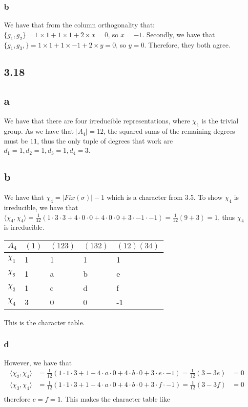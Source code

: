 \documentclass[]{article}
\begin{document}
\subsubsection*{b}
We have that from the column orthogonality that:
$\lbrace g_1, g_2 \rbrace = 1 \times 1 + 1 \times 1 + 2 \times x = 0$, so $x = -1$. Secondly, we have that $\lbrace g_1, g_3, \rbrace = 1 \times 1 + 1 \times -1 + 2 \times y = 0$, so $y = 0$. Therefore, they both agree. 
\newpage
\subsection*{3.18}
\subsection*{a}
We have that there are four irreducible representations, where $\chi_1$ is the trivial group. As we have that $|A_4| = 12$, the squared sums of the remaining degrees must be $11$, thus the only tuple of degrees that work are $d_1 = 1, d_2 = 1, d_3 = 1, d_4 = 3$. 
\subsection*{b}
We have that $\chi_4 = |Fix(\sigma)| - 1$ which is a character from 3.5. To show $\chi_4$ is irreducible, we have that $\langle \chi_4, \chi_4 \rangle = \frac{1}{12} \left(1 \cdot 3 \cdot 3 + 4 \cdot 0 \cdot 0 + 4 \cdot 0 \cdot 0 + 3 \cdot -1 \cdot -1\right) = \frac{1}{12} \left(9 + 3\right) = 1$, thus $\chi_4$ is irreducible. 

\begin{table}[h!]
\centering
\begin{tabular}{|l|l|l|l|l|}
	\hline
	$A_4$    & $(1)$ & $(123)$ & $(132)$ & $(12)(34)$ \\ \hline
	$\chi_1$ & 1     & 1       & 1       & 1          \\ \hline
	$\chi_2$ & 1     & a       & b       & e          \\ \hline
	$\chi_3$ & 1     & c       & d       & f          \\ \hline
	$\chi_4$ & 3     & 0       & 0       & -1         \\ \hline
\end{tabular}
\end{table}
This is the character table.
\subsubsection*{d}
 However, we have that 
\begin{align*}
	\langle \chi_2, \chi_4 \rangle &= \frac{1}{12}\left(1 \cdot 1 \cdot 3 + 1 + 4 \cdot a \cdot 0 + 4 \cdot b \cdot 0 + 3 \cdot e \cdot -1\right) = \frac{1}{12} (3 - 3e) &= 0\\
	\langle \chi_3, \chi_4 \rangle &= \frac{1}{12}\left(1 \cdot 1 \cdot 3 + 1 + 4 \cdot a \cdot 0 + 4 \cdot b \cdot 0 + 3 \cdot f \cdot -1\right) = \frac{1}{12} (3 - 3f) &= 0\\
\end{align*}
therefore $e = f = 1$. This makes the character table like
\end{document}
